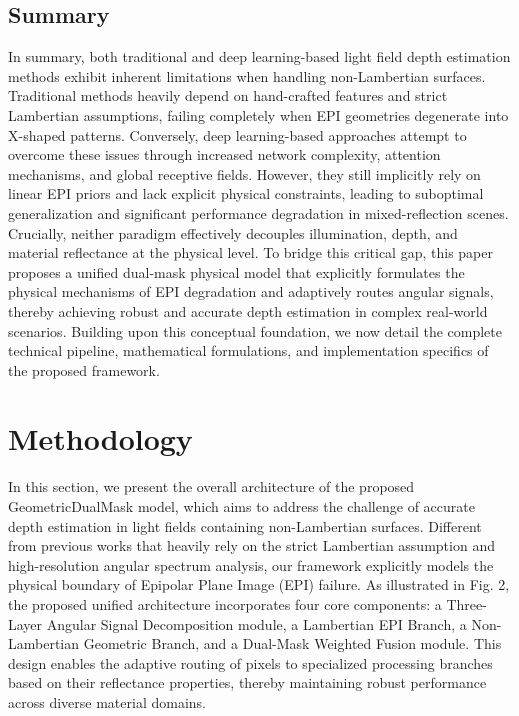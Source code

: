 \documentclass[lettersize,journal]{IEEEtran}
\begin{document}
\subsection{Summary}

In summary, both traditional and deep learning-based light field depth estimation methods exhibit inherent limitations when handling non-Lambertian surfaces. Traditional methods heavily depend on hand-crafted features and strict Lambertian assumptions, failing completely when EPI geometries degenerate into X-shaped patterns. Conversely, deep learning-based approaches attempt to overcome these issues through increased network complexity, attention mechanisms, and global receptive fields. However, they still implicitly rely on linear EPI priors and lack explicit physical constraints, leading to suboptimal generalization and significant performance degradation in mixed-reflection scenes. Crucially, neither paradigm effectively decouples illumination, depth, and material reflectance at the physical level. To bridge this critical gap, this paper proposes a unified dual-mask physical model that explicitly formulates the physical mechanisms of EPI degradation and adaptively routes angular signals, thereby achieving robust and accurate depth estimation in complex real-world scenarios. Building upon this conceptual foundation, we now detail the complete technical pipeline, mathematical formulations, and implementation specifics of the proposed framework.

\section{Methodology}

In this section, we present the overall architecture of the proposed GeometricDualMask model, which aims to address the challenge of accurate depth estimation in light fields containing non-Lambertian surfaces. Different from previous works that heavily rely on the strict Lambertian assumption and high-resolution angular spectrum analysis, our framework explicitly models the physical boundary of Epipolar Plane Image (EPI) failure. As illustrated in Fig. 2, the proposed unified architecture incorporates four core components: a Three-Layer Angular Signal Decomposition module, a Lambertian EPI Branch, a Non-Lambertian Geometric Branch, and a Dual-Mask Weighted Fusion module. This design enables the adaptive routing of pixels to specialized processing branches based on their reflectance properties, thereby maintaining robust performance across diverse material domains.
\end{document}

